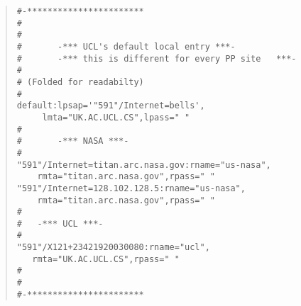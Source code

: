\begin{quote}\small\begin{verbatim}
#-***********************
#
#
#       -*** UCL's default local entry ***-
#       -*** this is different for every PP site   ***-
#
# (Folded for readabilty)
#
default:lpsap='"591"/Internet=bells',
     lmta="UK.AC.UCL.CS",lpass=" " 
#
#       -*** NASA ***-
#
"591"/Internet=titan.arc.nasa.gov:rname="us-nasa",
    rmta="titan.arc.nasa.gov",rpass=" "
"591"/Internet=128.102.128.5:rname="us-nasa",
    rmta="titan.arc.nasa.gov",rpass=" "
#
#	-*** UCL ***-
#
"591"/X121+23421920030080:rname="ucl",
   rmta="UK.AC.UCL.CS",rpass=" "
#
#
#-***********************
\end{verbatim}\end{quote}
